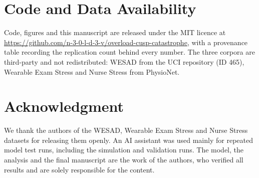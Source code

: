 \documentclass[conference]{IEEEtran}
\begin{document}
\section*{Code and Data Availability}
Code, figures and this manuscript are released under the MIT licence at
\url{https://github.com/n-3-0-l-d-3-v/overload-cusp-catastrophe}, with a
provenance table recording the replication count behind every number. The three
corpora are third-party and not redistributed: WESAD from the UCI repository
(ID 465), Wearable Exam Stress and Nurse Stress from PhysioNet.

\section*{Acknowledgment}
We thank the authors of the WESAD, Wearable Exam Stress and Nurse Stress
datasets for releasing them openly. An AI assistant was used mainly for
repeated model test runs, including the simulation and validation runs. The model, the analysis and the
final manuscript are the work of the authors, who verified all results and are
solely responsible for the content.



\end{document}

